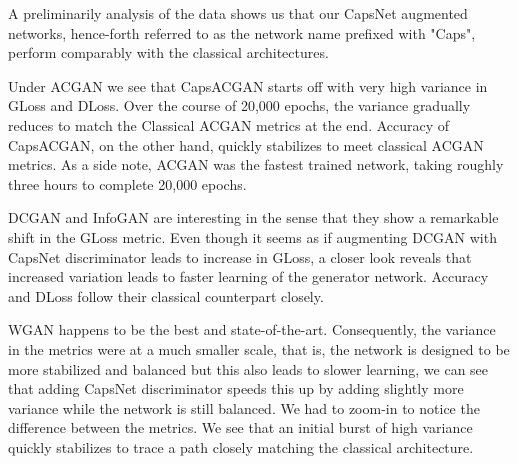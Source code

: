 A preliminarily analysis of the data shows us that our CapsNet augmented networks, hence-forth referred to as the network name prefixed with "Caps", perform comparably with the classical architectures. 
\par\bigskip

Under ACGAN we see that CapsACGAN starts off with very high variance in GLoss and DLoss. Over the course of 20,000 epochs, the variance gradually reduces to match the Classical ACGAN metrics at the end. Accuracy of CapsACGAN, on the other hand, quickly stabilizes to meet classical ACGAN metrics. As a side note, ACGAN was the fastest trained network, taking roughly three hours to complete 20,000 epochs.
\par\bigskip

DCGAN and InfoGAN are interesting in the sense that they show a remarkable shift in the GLoss metric. Even though it seems as if augmenting DCGAN with CapsNet discriminator leads to increase in GLoss, a closer look reveals that increased variation leads to faster learning of the generator network. Accuracy and DLoss follow their classical counterpart closely.
\par\bigskip

WGAN happens to be the best and state-of-the-art. Consequently, the variance in the metrics were at a much smaller scale, that is, the network is designed to be more stabilized and balanced but this also leads to slower learning, we can see that adding CapsNet discriminator speeds this up by adding slightly more variance while the network is still balanced. We had to zoom-in to notice the difference between the metrics. We see that an initial burst of high variance quickly stabilizes to trace a path closely matching the classical architecture.
\par\bigskip
\newpage

